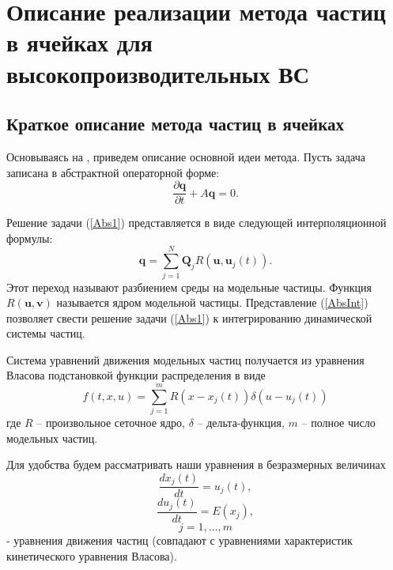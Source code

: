 \chapter{Описание реализации метода частиц в ячейках для высокопроизводительных ВС}
\label{chapt1}

\section{Краткое описание метода частиц в ячейках}


Основываясь на
\cite{VshivkovPICbook}, приведем описание основной идеи метода. Пусть задача записана 
в абстрактной операторной форме:
\begin{equation}
\label{Abs1}
\frac{\partial \textbf{q}}{\partial t} + A\textbf{q} = 0.
\end{equation}

Решение задачи (\ref{Abs1}) представляется в виде следующей интерполяционной 
формулы:
\begin{equation}
\label{AbsInt}
\textbf{q} = \sum\limits^{N}_{j=1}\textbf{Q}_j R(\textbf{u},\textbf{u}_j(t)).
\end{equation}
Этот переход называют разбиением среды на модельные частицы. Функция 
$R(\textbf{u},\textbf{v})$ называется ядром модельной частицы. Представление
(\ref{AbsInt}) позволяет свести решение задачи 
(\ref{Abs1}) к интегрированию динамической системы частиц.


\quad Система уравнений движения модельных частиц получается
\cite{VshivkovPICbook} из уравнения Власова подстановкой функции
распределения в виде
\begin{equation}\label{fr}
f(t,x,u)=\sum_{j=1}^m R(x-x_j(t))\delta(u-u_j(t))
\end{equation}
где $R$ -- произвольное сеточное ядро,  %
$\delta$ -- дельта-функция, $m$ -- полное число модельных частиц.

Для удобства будем рассматривать наши уравнения в безразмерных
величинах
\begin{equation}\label{dx}
\frac{dx_j(t)}{dt}=u_j(t),
\end{equation}
\begin{equation}\label{du}
\frac{du_j(t)}{dt}=E(x_j),
\end{equation}
\begin{displaymath}
j=1,\ldots, m
\end{displaymath}
- уравнения движения частиц (совпадают с уравнениями характеристик
кинетического уравнения Власова).

